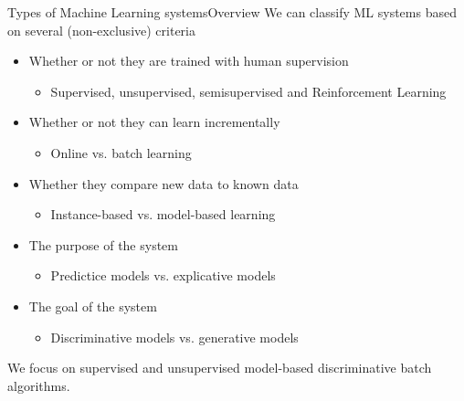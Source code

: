 \documentclass[10pt,compress]{beamer} %
\begin{document}
\begin{frame}{Types of Machine Learning systems}{Overview}
	We can classify ML systems based on several (non-exclusive) criteria
	\begin{itemize}
		\item Whether or not they are trained with human supervision
			\begin{itemize}
			\item Supervised, unsupervised, semisupervised and Reinforcement Learning
			\end{itemize}
		\item Whether or not they can learn incrementally
			\begin{itemize}
			\item Online vs. batch learning
			\end{itemize}
		\item Whether they compare new data to known data
			\begin{itemize}
			\item Instance-based vs. model-based learning
			\end{itemize}
		\item The purpose of the system
			\begin{itemize}
			\item Predictice models vs. explicative models
			\end{itemize}
		\item The goal of the system
			\begin{itemize}
			\item Discriminative models vs. generative models
			\end{itemize}
	\end{itemize}
	We focus on supervised and unsupervised model-based discriminative batch algorithms.
\end{frame}
\end{document}
